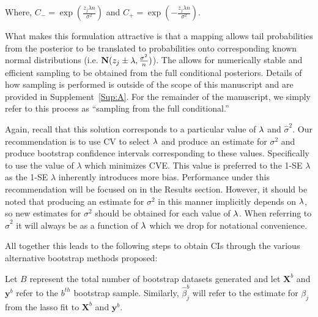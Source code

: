 Where, $C_{-} = \exp(\frac{z_j \lambda n}{\sigma^2})$ and $C_{+} = \exp(-\frac{z_j \lambda n}{\sigma^2})$.

What makes this formulation attractive is that a mapping allows tail probabilities from the posterior to be translated to probabilities onto corresponding known normal distributions (i.e. $\mathbf{N}(z_j \pm \lambda, \frac{\sigma^2}{n})$). The allows for numerically stable and efficient sampling to be obtained from the full conditional posteriors. Details of how sampling is performed is outside of the scope of this manuscript and are provided in Supplement~\ref{Sup:A}. For the remainder of the manuscript, we simply refer to this process as ``sampling from the full conditional.''

Again, recall that this solution corresponds to a particular value of $\lambda$ and $\hat{\sigma}^2$. Our recommendation is to use CV to select $\lambda$ and produce an estimate for $\sigma^2$ and produce bootstrap confidence intervals corresponding to these values. Specifically to use the value of $\lambda$ which minimizes CVE. This value is preferred to the 1-SE $\lambda$ as the 1-SE $\lambda$ inherently introduces more bias. Performance under this recommendation will be focused on in the Results section. However, it should be noted that producing an estimate for $\sigma^2$ in this manner implicitly depends on $\lambda$, so new estimates for $\sigma^2$ should be obtained for each value of $\lambda$. When referring to $\hat{\sigma}^2$ it will always be as a function of $\lambda$ which we drop for notational convenience.

All together this leads to the following steps to obtain CIs through the various alternative bootstrap methods proposed:

Let $B$ represent the total number of bootstrap datasets generated and let $\boldsymbol{X}^b$ and $\boldsymbol{y}^b$ refer to the $b^{th}$ bootstrap sample. Similarly, $\hat{\beta}^b_j$ will refer to the estimate for $\beta_j$ from the lasso fit to $\boldsymbol{X}^b$ and $\boldsymbol{y}^b$.

